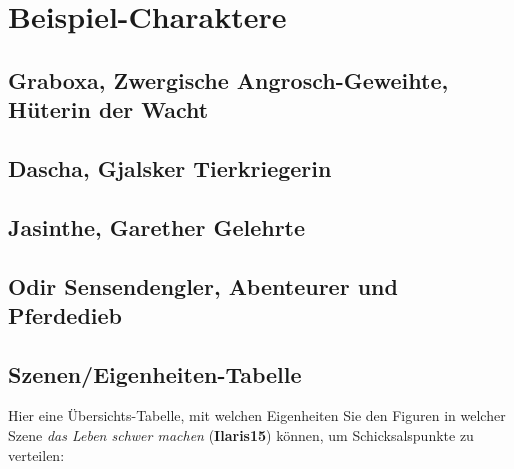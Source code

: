 \documentclass[openright]{Ilaris}
\begin{document}
\spaltenende
\newpage
\section{Beispiel-Charaktere}
\subsection{Graboxa, Zwergische Angrosch-Geweihte, Hüterin der Wacht}
\subsection{Dascha, Gjalsker Tierkriegerin}
\subsection{Jasinthe, Garether Gelehrte}
\subsection{Odir Sensendengler, Abenteurer und Pferdedieb}
\subsection{Szenen/Eigenheiten-Tabelle}
Hier eine Übersichts-Tabelle, mit welchen Eigenheiten Sie den Figuren in welcher Szene \emph{das Leben schwer machen} (\textbf{Ilaris15}) können, um Schicksalspunkte zu verteilen:
\end{document}
